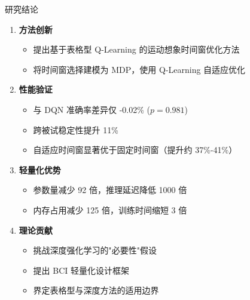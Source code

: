 \begin{frame}{研究结论}
    \begin{enumerate}
        \item \textbf{\color{primaryblue}方法创新}
        \begin{itemize}
            \item 提出基于表格型 Q-Learning 的运动想象时间窗优化方法
            \item 将时间窗选择建模为 MDP，使用 Q-Learning 自适应优化
        \end{itemize}

        \vspace{0.5em}
        \item \textbf{\color{primaryblue}性能验证}
        \begin{itemize}
            \item 与 DQN 准确率差异仅 -0.02\% ($p = 0.981$)
            \item 跨被试稳定性提升 11\%
            \item 自适应时间窗显著优于固定时间窗（提升约 37\%-41\%）
        \end{itemize}

        \vspace{0.5em}
        \item \textbf{\color{primaryblue}轻量化优势}
        \begin{itemize}
            \item 参数量减少 92 倍，推理延迟降低 1000 倍
            \item 内存占用减少 125 倍，训练时间缩短 3 倍
        \end{itemize}

        \vspace{0.5em}
        \item \textbf{\color{primaryblue}理论贡献}
        \begin{itemize}
            \item 挑战深度强化学习的"必要性"假设
            \item 提出 BCI 轻量化设计框架
            \item 界定表格型与深度方法的适用边界
        \end{itemize}
    \end{enumerate}
\end{frame}
